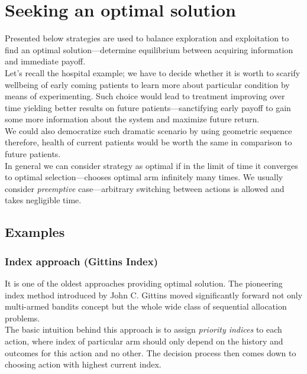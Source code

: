 \documentclass[12pt, a4paper, pdflatex, leqno]{report}
\begin{document}
\section{Seeking an optimal solution}
Presented below strategies are used to balance exploration and exploitation to find an optimal solution---determine equilibrium between acquiring information and immediate payoff.\\
Let's recall the hospital example; we have to decide whether it is worth to scarify wellbeing of early coming patients to learn more about particular condition by means of experimenting. Such choice would lead to treatment improving over time yielding better results on future patients---sanctifying early payoff to gain some more information about the system and maximize future return.\\
We could also democratize such dramatic scenario by using geometric sequence therefore, health of current patients would be worth the same in comparison to future patients.\\

In general we can consider strategy as optimal if in the limit of time it converges to optimal selection---chooses optimal arm infinitely many times. We usually consider \emph{preemptive} case---arbitrary switching between actions is allowed and takes negligible time.\\

\subsection{Examples}

\subsubsection{Index approach (Gittins Index)\label{sec:gitind}}
It is one of the oldest approaches providing optimal solution. The pioneering index method introduced by John C. Gittins moved significantly forward not only multi-armed bandits concept but the whole wide class of sequential allocation problems.\\

The basic intuition behind this approach is to assign \emph{priority indices} to each action, where index of particular arm should only depend on the history and outcomes for this action and no other. The decision process then comes down to choosing action with highest current index.\\
\end{document}
